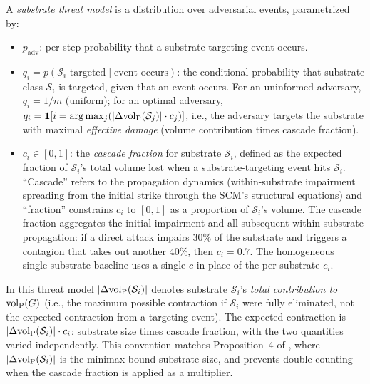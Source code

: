 \begin{definition}
\label{def:threat_model}
A \emph{substrate threat model} is a distribution over adversarial events,
    parametrized by:
\begin{itemize}
\item $p_{\mathrm{adv}}$: per-step probability that a substrate-targeting
    event occurs.
\item $q_i = p(\mathcal{S}_i \text{ targeted} \mid \text{event occurs})$:
    the conditional probability that substrate class $\mathcal{S}_i$ is
    targeted, given that an event occurs. For an uninformed adversary,
    $q_i = 1/m$ (uniform); for an optimal adversary,
    $q_i = \mathbf{1}[i = \arg\max_j (|\Delta {\operatorname{vol}_{\mathrm{P}}}(\mathcal{S}_j)|
    \cdot c_j)]$, i.e., the adversary targets the substrate with
    maximal \emph{effective damage} (volume contribution times
    cascade fraction).
\item $c_i \in [0, 1]$: the \emph{cascade fraction} for substrate
    $\mathcal{S}_i$, defined as the expected fraction of
    $\mathcal{S}_i$'s total volume lost when a substrate-targeting
    event hits $\mathcal{S}_i$. ``Cascade'' refers to the propagation
    dynamics (within-substrate impairment spreading from the
    initial strike through the SCM's structural equations) and
    ``fraction'' constrains $c_i$ to $[0, 1]$ as a proportion of
    $\mathcal{S}_i$'s volume. The cascade fraction aggregates the
    initial impairment and all subsequent within-substrate
    propagation: if a direct attack impairs 30\% of the substrate
    and triggers a contagion that takes out another 40\%, then
    $c_i = 0.7$. The homogeneous single-substrate baseline uses a
    single $c$ in place of the per-substrate $c_i$.
\end{itemize}
In this threat model $|\Delta {\operatorname{vol}_{\mathrm{P}}}(\mathcal{S}_i)|$ denotes
    substrate $\mathcal{S}_i$'s \emph{total contribution to ${\operatorname{vol}_{\mathrm{P}}}(G)$}
    (i.e., the maximum possible contraction if $\mathcal{S}_i$
    were fully eliminated, not the expected contraction from a
    targeting event). The expected contraction is
    $|\Delta {\operatorname{vol}_{\mathrm{P}}}(\mathcal{S}_i)| \cdot c_i$: substrate size times
    cascade fraction, with the two quantities varied independently.
    This convention matches Proposition~4 of \citet{lasser2026horizon},
    where $|\Delta {\operatorname{vol}_{\mathrm{P}}}(\mathcal{S}_i)|$ is the minimax-bound
    substrate size, and prevents double-counting when the cascade
    fraction is applied as a multiplier.
\end{definition}

